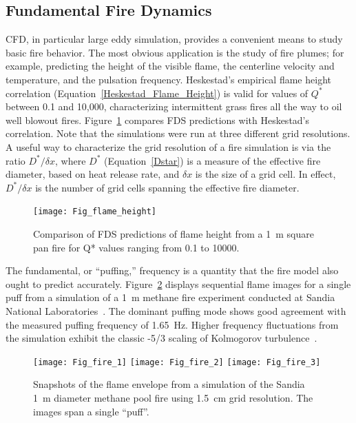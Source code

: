 \documentclass[graybox]{svmult}
\begin{document}
\subsection{Fundamental Fire Dynamics}

CFD, in particular large eddy simulation, provides a convenient means to study basic fire behavior. The most obvious application is the study of fire plumes; for example, predicting the height of the visible flame, the centerline velocity and temperature, and the pulsation frequency. Heskestad's empirical flame height correlation (Equation~\ref{Heskestad_Flame_Height}) is valid for values of  $Q^*$ between 0.1 and 10,000, characterizing intermittent grass fires all the way to oil well blowout fires. Figure~\ref{Flame_Height} compares FDS predictions with Heskestad's correlation. Note that the simulations were run at three different grid resolutions. A useful way to characterize the grid resolution of a fire simulation is via the ratio $D^*/\delta x$, where $D^*$ (Equation~\ref{Dstar}) is a measure of the effective fire diameter, based on heat release rate, and $\delta x$ is the size of a grid cell. In effect, $D^*/\delta x$ is the number of grid cells spanning the effective fire diameter.
\begin{figure}[ht]
\begin{center}
\texttt{[image: Fig\_flame\_height]}
\end{center}
\caption{Comparison of FDS predictions of flame height from a 1~m square pan fire for Q* values ranging from
0.1 to 10000.}
\label{Flame_Height}
\end{figure}

The fundamental, or ``puffing,'' frequency is a quantity that the fire model also ought to predict accurately. Figure~\ref{Sandia_Simulation} displays sequential flame images for a single puff from a simulation of a 1~m methane fire experiment conducted at Sandia National Laboratories~\cite{Tieszen:2002}. The dominant puffing mode shows good agreement with the measured puffing frequency of 1.65~Hz. Higher frequency fluctuations from the simulation exhibit the classic -5/3 scaling of Kolmogorov turbulence~\cite{Pope:2000}.
\begin{figure}[ht]
\begin{center}
\texttt{[image: Fig\_fire\_1]}
\texttt{[image: Fig\_fire\_2]}
\texttt{[image: Fig\_fire\_3]}
\end{center}
\caption{Snapshots of the flame envelope from a simulation of the Sandia 1~m diameter methane pool fire using 1.5~cm grid resolution.  The images span a single ``puff''.}
\label{Sandia_Simulation}
\end{figure}
\end{document}
